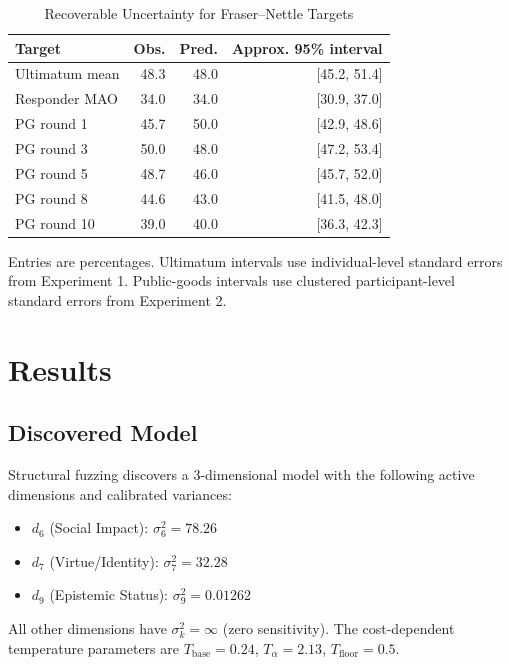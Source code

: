 \documentclass[journal]{IEEEtran}
\begin{document}
\begin{table}[!t]
\renewcommand{\arraystretch}{1.1}
\caption{Recoverable Uncertainty for Fraser--Nettle Targets}
\label{tab:ci_recoverable}
\centering
\begin{tabular}{l r r r}
\toprule
\textbf{Target} & \textbf{Obs.} & \textbf{Pred.} & \textbf{Approx. 95\% interval} \\
\midrule
Ultimatum mean & 48.3 & 48.0 & [45.2, 51.4] \\
Responder MAO & 34.0 & 34.0 & [30.9, 37.0] \\
PG round 1 & 45.7 & 50.0 & [42.9, 48.6] \\
PG round 3 & 50.0 & 48.0 & [47.2, 53.4] \\
PG round 5 & 48.7 & 46.0 & [45.7, 52.0] \\
PG round 8 & 44.6 & 43.0 & [41.5, 48.0] \\
PG round 10 & 39.0 & 40.0 & [36.3, 42.3] \\
\bottomrule
\end{tabular}
\begin{flushleft}
\footnotesize{Entries are percentages. Ultimatum intervals use individual-level standard errors from Experiment 1. Public-goods intervals use clustered participant-level standard errors from Experiment 2.}
\end{flushleft}
\end{table}
\section{Results}
\label{sec:results}

\subsection{Discovered Model}

Structural fuzzing discovers a 3-dimensional model with the following active dimensions and calibrated variances:
\begin{itemize}
    \item $d_6$ (Social Impact): $\sigma_6^2 = 78.26$
    \item $d_7$ (Virtue/Identity): $\sigma_7^2 = 32.28$
    \item $d_9$ (Epistemic Status): $\sigma_9^2 = 0.01262$
\end{itemize}
All other dimensions have $\sigma_k^2 = \infty$ (zero sensitivity).
The cost-dependent temperature parameters are $T_{\text{base}} = 0.24$, $T_\alpha = 2.13$, $T_{\text{floor}} = 0.5$.
\end{document}
